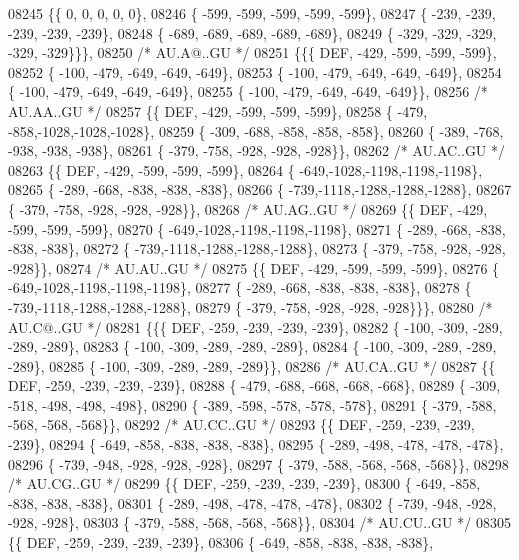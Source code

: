 \begin{DoxyCode}
08245 \{\{    0,    0,    0,    0,    0\},
08246 \{ -599, -599, -599, -599, -599\},
08247 \{ -239, -239, -239, -239, -239\},
08248 \{ -689, -689, -689, -689, -689\},
08249 \{ -329, -329, -329, -329, -329\}\}\},
08250 \textcolor{comment}{/* AU.A@..GU */}
08251 \{\{\{  DEF, -429, -599, -599, -599\},
08252 \{ -100, -479, -649, -649, -649\},
08253 \{ -100, -479, -649, -649, -649\},
08254 \{ -100, -479, -649, -649, -649\},
08255 \{ -100, -479, -649, -649, -649\}\},
08256 \textcolor{comment}{/* AU.AA..GU */}
08257 \{\{  DEF, -429, -599, -599, -599\},
08258 \{ -479, -858,-1028,-1028,-1028\},
08259 \{ -309, -688, -858, -858, -858\},
08260 \{ -389, -768, -938, -938, -938\},
08261 \{ -379, -758, -928, -928, -928\}\},
08262 \textcolor{comment}{/* AU.AC..GU */}
08263 \{\{  DEF, -429, -599, -599, -599\},
08264 \{ -649,-1028,-1198,-1198,-1198\},
08265 \{ -289, -668, -838, -838, -838\},
08266 \{ -739,-1118,-1288,-1288,-1288\},
08267 \{ -379, -758, -928, -928, -928\}\},
08268 \textcolor{comment}{/* AU.AG..GU */}
08269 \{\{  DEF, -429, -599, -599, -599\},
08270 \{ -649,-1028,-1198,-1198,-1198\},
08271 \{ -289, -668, -838, -838, -838\},
08272 \{ -739,-1118,-1288,-1288,-1288\},
08273 \{ -379, -758, -928, -928, -928\}\},
08274 \textcolor{comment}{/* AU.AU..GU */}
08275 \{\{  DEF, -429, -599, -599, -599\},
08276 \{ -649,-1028,-1198,-1198,-1198\},
08277 \{ -289, -668, -838, -838, -838\},
08278 \{ -739,-1118,-1288,-1288,-1288\},
08279 \{ -379, -758, -928, -928, -928\}\}\},
08280 \textcolor{comment}{/* AU.C@..GU */}
08281 \{\{\{  DEF, -259, -239, -239, -239\},
08282 \{ -100, -309, -289, -289, -289\},
08283 \{ -100, -309, -289, -289, -289\},
08284 \{ -100, -309, -289, -289, -289\},
08285 \{ -100, -309, -289, -289, -289\}\},
08286 \textcolor{comment}{/* AU.CA..GU */}
08287 \{\{  DEF, -259, -239, -239, -239\},
08288 \{ -479, -688, -668, -668, -668\},
08289 \{ -309, -518, -498, -498, -498\},
08290 \{ -389, -598, -578, -578, -578\},
08291 \{ -379, -588, -568, -568, -568\}\},
08292 \textcolor{comment}{/* AU.CC..GU */}
08293 \{\{  DEF, -259, -239, -239, -239\},
08294 \{ -649, -858, -838, -838, -838\},
08295 \{ -289, -498, -478, -478, -478\},
08296 \{ -739, -948, -928, -928, -928\},
08297 \{ -379, -588, -568, -568, -568\}\},
08298 \textcolor{comment}{/* AU.CG..GU */}
08299 \{\{  DEF, -259, -239, -239, -239\},
08300 \{ -649, -858, -838, -838, -838\},
08301 \{ -289, -498, -478, -478, -478\},
08302 \{ -739, -948, -928, -928, -928\},
08303 \{ -379, -588, -568, -568, -568\}\},
08304 \textcolor{comment}{/* AU.CU..GU */}
08305 \{\{  DEF, -259, -239, -239, -239\},
08306 \{ -649, -858, -838, -838, -838\},

\end{DoxyCode}
